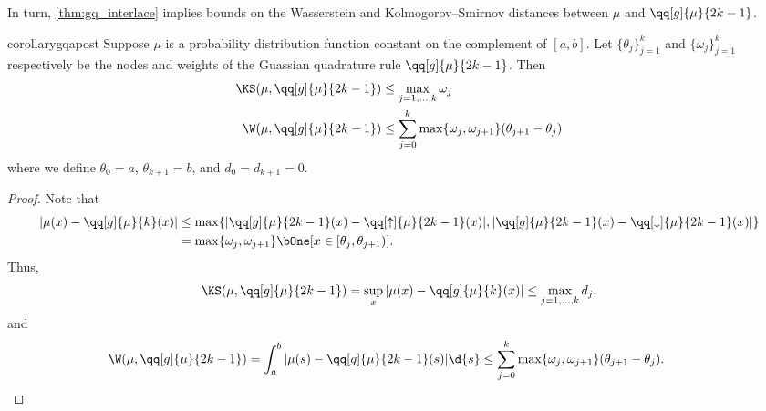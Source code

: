 In turn, \cref{thm:gq_interlace} implies bounds on the Wasserstein and Kolmogorov--Smirnov distances between \( \mu \) and \( \qq[g]{\mu}{2k-1} \).


\begin{restatable}{corollary}{gqapost}
\label{thm:gq_apost}
Suppose \( \mu \) is a probability distribution function constant on the complement of \( [a,b] \). %
Let \( \{ \theta_j \}_{j=1}^{k} \) and \( \{ \omega_j \}_{j=1}^{k} \) respectively be the nodes and weights of the Guassian quadrature rule \( \qq[g]{\mu}{2k-1} \).
Then
\begin{align*}
    \KS(\mu,\qq[g]{\mu}{2k-1}) 
    &\leq \max_{j=1,\ldots,k} \omega_j 
    \\
    \W(\mu,\qq[g]{\mu}{2k-1})
    &\leq \sum_{j=0}^{k} \max\{\omega_j,\omega_{j+1}\} ( \theta_{j+1} - \theta_j )
\end{align*}
where we define \( \theta_0 = a \), \( \theta_{k+1} = b \), and \( d_0 = d_{k+1} = 0 \).
\end{restatable}


\begin{proof}
Note that
\begin{align*}
    | \mu(x) - \qq[g]{\mu}{k}(x) | 
    &\leq \max\{ | \qq[g]{\mu}{2k-1}(x) - \qq[\uparrow]{\mu}{2k-1}(x) |, |\qq[g]{\mu}{2k-1}(x) - \qq[\downarrow]{\mu}{2k-1}(x) | \} 
    \\&= \max\{ \omega_j,\omega_{j+1} \} \bOne[ x\in [\theta_j,\theta_{j+1}) ].
\end{align*}
Thus,
\begin{equation*}
    \KS(\mu,\qq[g]{\mu}{2k-1})
    = \sup_{x} | \mu(x) - \qq[g]{\mu}{k}(x) |
    \leq \max_{j=1,\ldots, k} d_j. 
\end{equation*}
and
\begin{equation*}
    \W(\mu,\qq[g]{\mu}{2k-1})
    = \int_{a}^{b} |\mu(s) - \qq[g]{\mu}{2k-1}(s) | \d{s}
    \leq \sum_{j=0}^{k} \max\{\omega_j,\omega_{j+1}\} ( \theta_{j+1} - \theta_j ).
    \tag*{\qedhere}
\end{equation*}
\end{proof}




